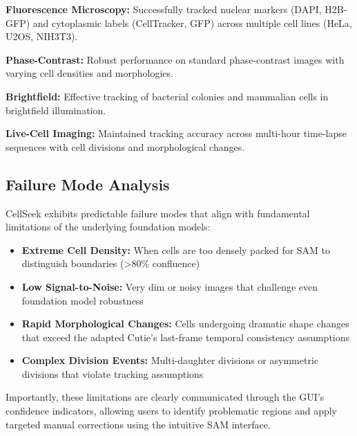 \documentclass[../cellseek_paper.tex]{subfiles}
\begin{document}
\textbf{Fluorescence Microscopy:} Successfully tracked nuclear markers (DAPI, H2B-GFP) and cytoplasmic labels (CellTracker, GFP) across multiple cell lines (HeLa, U2OS, NIH3T3).

\textbf{Phase-Contrast:} Robust performance on standard phase-contrast images with varying cell densities and morphologies.

\textbf{Brightfield:} Effective tracking of bacterial colonies and mammalian cells in brightfield illumination.

\textbf{Live-Cell Imaging:} Maintained tracking accuracy across multi-hour time-lapse sequences with cell divisions and morphological changes.

\subsection{Failure Mode Analysis}

CellSeek exhibits predictable failure modes that align with fundamental limitations of the underlying foundation models:

\begin{itemize}
  \item \textbf{Extreme Cell Density:} When cells are too densely packed for SAM to distinguish boundaries (>80\% confluence)
  \item \textbf{Low Signal-to-Noise:} Very dim or noisy images that challenge even foundation model robustness
  \item \textbf{Rapid Morphological Changes:} Cells undergoing dramatic shape changes that exceed the adapted Cutie's last-frame temporal consistency assumptions
  \item \textbf{Complex Division Events:} Multi-daughter divisions or asymmetric divisions that violate tracking assumptions
\end{itemize}

Importantly, these limitations are clearly communicated through the GUI's confidence indicators, allowing users to identify problematic regions and apply targeted manual corrections using the intuitive SAM interface.
\end{document}

